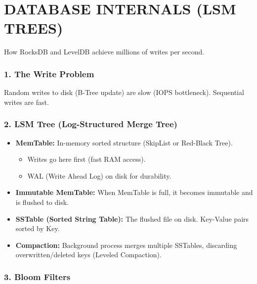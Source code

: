 \hypertarget{database-internals-lsm-trees}{%
\chapter{DATABASE INTERNALS (LSM
TREES)}\label{database-internals-lsm-trees}}

How RocksDB and LevelDB achieve millions of writes per second.

\hypertarget{the-write-problem}{%
\subsection{1. The Write Problem}\label{the-write-problem}}

Random writes to disk (B-Tree update) are slow (IOPS bottleneck).
Sequential writes are fast.

\hypertarget{lsm-tree-log-structured-merge-tree}{%
\subsection{2. LSM Tree (Log-Structured Merge
Tree)}\label{lsm-tree-log-structured-merge-tree}}

\begin{itemize}
\tightlist
\item
  \textbf{MemTable:} In-memory sorted structure (SkipList or Red-Black
  Tree).

  \begin{itemize}
  \tightlist
  \item
    Writes go here first (fast RAM access).
  \item
    WAL (Write Ahead Log) on disk for durability.
  \end{itemize}
\item
  \textbf{Immutable MemTable:} When MemTable is full, it becomes
  immutable and is flushed to disk.
\item
  \textbf{SSTable (Sorted String Table):} The flushed file on disk.
  Key-Value pairs sorted by Key.
\item
  \textbf{Compaction:} Background process merges multiple SSTables,
  discarding overwritten/deleted keys (Leveled Compaction).
\end{itemize}

\hypertarget{bloom-filters}{%
\subsection{3. Bloom Filters}\label{bloom-filters}}

